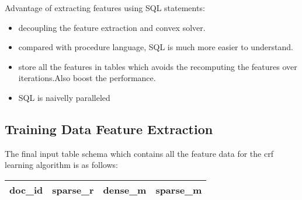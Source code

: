 Advantage of extracting features using SQL statements:
\begin{itemize}
\item decoupling the feature extraction and convex solver.
\item compared with procedure language, SQL is much more easier to understand.
\item store all the features in tables which avoids the recomputing the features over iterations.Also boost the performance.
\item SQL is naivelly paralleled
\end{itemize}

\subsection{Training Data Feature Extraction}
The final input table schema which contains all the feature data for the crf learning algorithm is as follows:
\begin{center}
    \begin{tabular}{ | l | l | l | l |}
    \hline
    doc\_id & sparse\_r & dense\_m & sparse\_m \\ 
    \hline
    \end{tabular}
\end{center}

